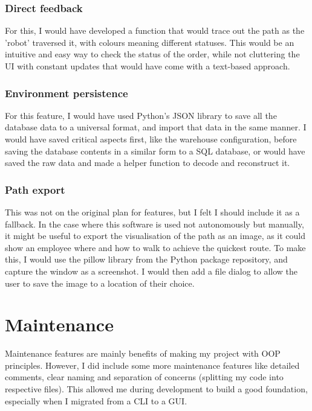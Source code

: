 \subsubsection{Direct feedback}

For this, I would have developed a function that would trace out the path as the 'robot' traversed it, with colours meaning different statuses. This would be an intuitive and easy way to check the status of the order, while not cluttering the UI with constant updates that would have come with a text-based approach. 

\subsubsection{Environment persistence}

For this feature, I would have used Python's JSON library to save all the database data to a universal format, and import that data in the same manner. I would have saved critical aspects first, like the warehouse configuration, before saving the database contents in a similar form to a SQL database, or would have saved the raw data and made a helper function to decode and reconstruct it.

\subsubsection{Path export}

This was not on the original plan for features, but I felt I should include it as a fallback. In the case where this software is used not autonomously but manually, it might be useful to export the visualisation of the path as an image, as it could show an employee where and how to walk to achieve the quickest route. To make this, I would use the pillow library from the Python package repository, and capture the window as a screenshot. I would then add a file dialog to allow the user to save the image to a location of their choice.

\section{Maintenance}

Maintenance features are mainly benefits of making my project with OOP principles. However, I did include some more maintenance features like detailed comments, clear naming and separation of concerns (splitting my code into respective files). This allowed me during development to build a good foundation, especially when I migrated from a CLI to a GUI. 

